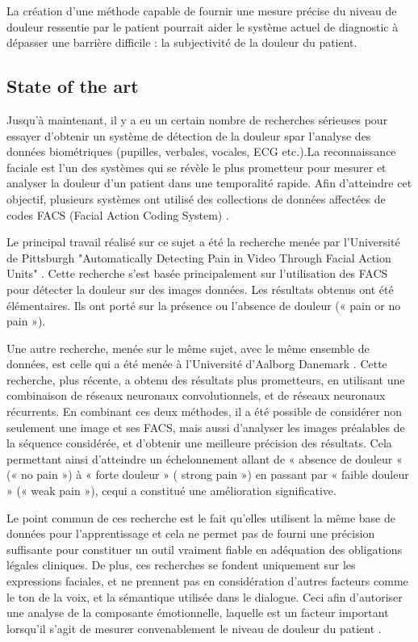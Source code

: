\documentclass[11pt]{article}
\begin{document}
La création d’une méthode capable de fournir une mesure précise du niveau de douleur ressentie
par le patient pourrait aider le système actuel de diagnostic à dépasser une
barrière difficile : la subjectivité de la douleur du patient. 

\subsection{State of the art}
\label{sec:org08f9dfb}
Jusqu’à maintenant, il y a eu un certain nombre de recherches sérieuses pour
essayer d’obtenir un système de détection de la douleur spar l’analyse des
données biométriques (pupilles, verbales, vocales, ECG etc.).La reconnaissance
faciale est l'un des systèmes qui se révèle le plus prometteur pour mesurer et
analyser la douleur d'un patient dans une temporalité rapide.  Afin d’atteindre
cet objectif, plusieurs systèmes ont utilisé des collections de données
affectées de codes FACS (Facial Action Coding System) \cite{lucey2011painful}. 

Le principal travail réalisé sur ce sujet a été la recherche menée par
l’Université de Pittsburgh "Automatically Detecting Pain in Video Through Facial
Action Units" \cite{lucey2011automatically}. Cette recherche s’est basée principalement sur l’utilisation
des FACS pour détecter la douleur sur des images données. Les résultats obtenus
ont été élémentaires. Ils ont porté sur la présence ou l’absence de douleur («
pain or no pain »). 

Une autre recherche, menée sur le même sujet, avec le même ensemble de données,
est celle qui a été menée à l’Université d’Aalborg Danemark
\cite{bellantonio2016spatio}. Cette recherche, plus récente, a obtenu des
résultats plus prometteurs, en utilisant une combinaison de réseaux neuronaux
convolutionnels, et de réseaux neuronaux récurrents. En combinant ces deux
méthodes, il a été possible de considérer non seulement une image et ses FACS,
mais aussi d’analyser les images préalables de la séquence considérée, et
d’obtenir une meilleure précision des résultats. Cela permettant ainsi
d’atteindre un échelonnement allant de « absence de douleur « (« no pain ») à
« forte douleur » ( strong pain ») en passant par « faible douleur » (« weak
pain »), cequi a constitué une amélioration significative. 

Le point commun de ces recherche est le fait qu’elles utilisent la même base de
données pour l’apprentissage et cela ne permet pas de fourni une précision
suffisante pour constituer un outil vraiment fiable en adéquation des
obligations légales cliniques. De plus, ces recherches se fondent uniquement sur
les expressions faciales, et ne prennent pas en considération d’autres facteurs
comme le ton de la voix, et la sémantique utilisée dans le dialogue.  Ceci afin
d’autoriser une analyse de la composante émotionnelle, laquelle est un facteur
important lorsqu’il s’agit de mesurer convenablement le niveau de douleur du
patient  \cite{hale1997emotional}.   
\end{document}
